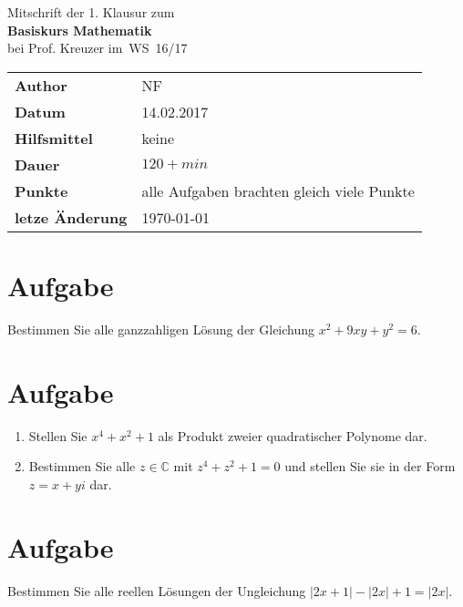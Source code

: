 \documentclass[a4paper,10pt]{article}
\begin{document}
\begin{center}
	\huge Mitschrift der 1. Klausur zum \\
	\Huge \textbf{Basiskurs Mathematik} \\
	\huge bei Prof. Kreuzer im WS 16/17 \\
	\normalsize

	\vspace{.5cm}
	\begin{tabular}[b]{l|l}
		\textbf{Author} & NF \\ %
		\textbf{Datum} & 14.02.2017 \\
		\textbf{Hilfsmittel} & keine \\
		\textbf{Dauer} & $120+ min$ \\
		\textbf{Punkte} & alle Aufgaben brachten gleich viele Punkte \\
		\textbf{letze Änderung} & \today \\
	\end{tabular}

	\vspace{.5cm}
\end{center}

\renewcommand\thesection{\arabic{section}.}

\section{Aufgabe}
Bestimmen Sie alle ganzzahligen Lösung der Gleichung $x^2+9xy+y^2=6$.

\section{Aufgabe}
\begin{enumerate}[label=\alph*)]
\item Stellen Sie $x^4+x^2+1$ als Produkt zweier quadratischer Polynome dar.
\item Bestimmen Sie alle $z \in \mathbb{C}$ mit $z^4+z^2+1=0$ und stellen Sie sie in der Form $z = x + y i$ dar.
\end{enumerate}

\section{Aufgabe}
Bestimmen Sie alle reellen Lösungen der Ungleichung $|2x+1|-|2x|+1=|2x|$. 
\end{document}
